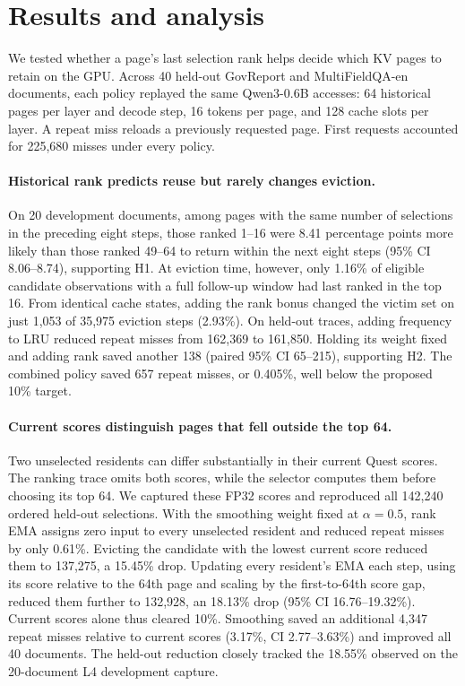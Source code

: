 \section{Results and analysis}
We tested whether a page's last selection rank helps decide which KV pages to retain on the GPU. Across 40 held-out GovReport and MultiFieldQA-en documents, each policy replayed the same Qwen3-0.6B accesses: 64 historical pages per layer and decode step, 16 tokens per page, and 128 cache slots per layer. A repeat miss reloads a previously requested page. First requests accounted for 225,680 misses under every policy.

\paragraph{Historical rank predicts reuse but rarely changes eviction.}
On 20 development documents, among pages with the same number of selections in the preceding eight steps, those ranked 1--16 were 8.41 percentage points more likely than those ranked 49--64 to return within the next eight steps (95\% CI 8.06--8.74), supporting H1. At eviction time, however, only 1.16\% of eligible candidate observations with a full follow-up window had last ranked in the top 16. From identical cache states, adding the rank bonus changed the victim set on just 1,053 of 35,975 eviction steps (2.93\%). On held-out traces, adding frequency to LRU reduced repeat misses from 162,369 to 161,850. Holding its weight fixed and adding rank saved another 138 (paired 95\% CI 65--215), supporting H2. The combined policy saved 657 repeat misses, or 0.405\%, well below the proposed 10\% target.

\paragraph{Current scores distinguish pages that fell outside the top 64.}
Two unselected residents can differ substantially in their current Quest scores. The ranking trace omits both scores, while the selector computes them before choosing its top 64. We captured these FP32 scores and reproduced all 142,240 ordered held-out selections. With the smoothing weight fixed at $\alpha=0.5$, rank EMA assigns zero input to every unselected resident and reduced repeat misses by only 0.61\%. Evicting the candidate with the lowest current score reduced them to 137,275, a 15.45\% drop. Updating every resident's EMA each step, using its score relative to the 64th page and scaling by the first-to-64th score gap, reduced them further to 132,928, an 18.13\% drop (95\% CI 16.76--19.32\%). Current scores alone thus cleared 10\%. Smoothing saved an additional 4,347 repeat misses relative to current scores (3.17\%, CI 2.77--3.63\%) and improved all 40 documents. The held-out reduction closely tracked the 18.55\% observed on the 20-document L4 development capture.


